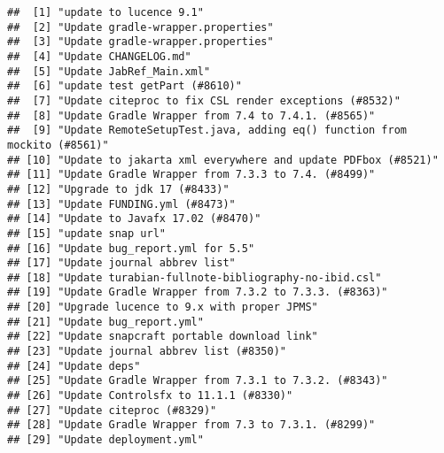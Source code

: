 \documentclass[
]{article}
\begin{document}
\begin{verbatim}
##  [1] "update to lucence 9.1"                                                          
##  [2] "Update gradle-wrapper.properties"                                               
##  [3] "Update gradle-wrapper.properties"                                               
##  [4] "Update CHANGELOG.md"                                                            
##  [5] "Update JabRef_Main.xml"                                                         
##  [6] "update test getPart (#8610)"                                                    
##  [7] "Update citeproc to fix CSL render exceptions (#8532)"                           
##  [8] "Update Gradle Wrapper from 7.4 to 7.4.1. (#8565)"                               
##  [9] "Update RemoteSetupTest.java, adding eq() function from mockito (#8561)"         
## [10] "Update to jakarta xml everywhere and update PDFbox (#8521)"                     
## [11] "Update Gradle Wrapper from 7.3.3 to 7.4. (#8499)"                               
## [12] "Upgrade to jdk 17 (#8433)"                                                      
## [13] "Update FUNDING.yml (#8473)"                                                     
## [14] "Update to Javafx 17.02 (#8470)"                                                 
## [15] "update snap url"                                                                
## [16] "Update bug_report.yml for 5.5"                                                  
## [17] "Update journal abbrev list"                                                     
## [18] "Update turabian-fullnote-bibliography-no-ibid.csl"                              
## [19] "Update Gradle Wrapper from 7.3.2 to 7.3.3. (#8363)"                             
## [20] "Upgrade lucence to 9.x with proper JPMS"                                        
## [21] "Update bug_report.yml"                                                          
## [22] "Update snapcraft portable download link"                                        
## [23] "Update journal abbrev list (#8350)"                                             
## [24] "Update deps"                                                                    
## [25] "Update Gradle Wrapper from 7.3.1 to 7.3.2. (#8343)"                             
## [26] "Update Controlsfx to 11.1.1 (#8330)"                                            
## [27] "Update citeproc (#8329)"                                                        
## [28] "Update Gradle Wrapper from 7.3 to 7.3.1. (#8299)"                               
## [29] "Update deployment.yml"                                                          

\end{verbatim}
\end{document}
